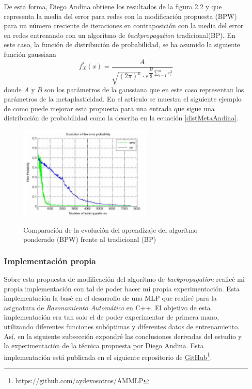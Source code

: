 \documentclass[10pt,a4paper]{report}
\begin{document}
De esta forma, Diego Andina obtiene los resultados de la figura 2.2 y que representa la media del error para redes con la modificación propuesta (BPW) para un número creciente de iteraciones en contraposición con la media del error en redes entrenando con un algorítmo de \textit{backpropagation} tradicional(BP). En este caso, la función de distribución de probabilidad, se ha asumido la siguiente función gaussiana
\begin{equation}
	\label{distMetaAndina}
	f^*_X(x) = \dfrac{A}{\sqrt{(2\pi)^n} \cdot e^{\dfrac{B}{8} \sum_{i=1}^n{x_i^2}}}
\end{equation}
donde $A$ y $B$ son los parámetros de la gaussiana que en este caso representan los parámetros de la metaplasticidad. En el artículo\citep{Andina2009} se muestra el siguiente ejemplo de como puede mejorar esta propuesta para una entrada que sigue una distribución de probabilidad como la descrita en la ecuación \ref{distMetaAndina}.

\begin{figure}[h!]{}
    \centering
    \includegraphics[width=0.6\textwidth]{img/ArticleResults.png}
    \label{fig:andinaResults}
    \caption{Comparación de la evolución del aprendizaje del algorítmo ponderado (BPW) frente al tradicional (BP)}
\end{figure}

\subsubsection{Implementación propia}
Sobre esta propuesta de modificación del algorítmo de \textit{backpropagation} realicé mi propia implementación con tal de poder hacer mi propia experimentación. Esta implementación la basé en el desarrollo de una MLP que realicé para la asignatura de \textit{Razonamiento Automático} en C++. El objetivo de esta implementación era tan solo el de poder experimentar de primera mano, utilizando diferentes funciones subóptimas y diferentes datos de entrenamiento. 
Así, en la siguiente subsección expondré las conclusiones derivadas del estudio y la experimentación de la técnica propuesta por Diego Andina.
 Esta implementación está publicada en el siguiente repositorio de \href{https://github.com/aydevosotros/AMMLP}{GitHub}\footnote{https://github.com/aydevosotros/AMMLP}.
\end{document}
